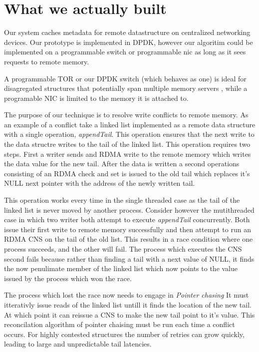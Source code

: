 \section{What we actually built}

Our system caches metadata for remote datastructure on centralized
networking devices. Our prototype is implemented in DPDK, however our
algoritim could be implemented on a programmable switch or
programmable nic as long as it sees requests to remote memory. 

A programmable TOR or our DPDK switch (which behaves as one) is ideal
for disagregated structures that potentially span multiple memory
servers , while a programable NIC is limited to the memory it is
attached to. 

The purpose of our technique is to resolve write conflicts to remote
memory. As an example of a conflict take a linked list implemented as
a remote data structure with a single operation, \textit{appendTail}.
This operation ensures that the next write to the data structre writes
to the tail of the linked list. This operation requires two steps.
First a writer sends and RDMA write to the remote memory which writes
the data value for the new tail. After the data is written a second
operations consisting of an RDMA check and set is issued to the old
tail which replaces it's NULL next pointer with the address of the
newly written tail.

This operation works every time in the single threaded case as the
tail of the linked list is never moved by another process. Consider
however the mutithreaded case in which two writer both attempt to
execute \textit{appendTail} concurrently. Both issue their first write
to remote memory successfully and then attempt to run an RDMA CNS on
the tail of the old list. This results in a race condition where one
process succeeds, and the other will fail. The process which executes
the CNS second fails because rather than finding a tail with a next
value of NULL, it finds the now penulimate member of the linked list
which now points to the value issued by the process which won the
race. 

The process which lost the race now needs to engage in \textit{Pointer
chasing} It must itterativly issue reads of the linked list untill it
finds the location of the new tail. At which point it can reissue a
CNS to make the new tail point to it's value. This reconcilation
algorithm of pointer chaising must be run each time a conflict occurs.
For highly contested structures the number of retries can grow
quickly, leading to large and unpredictable tail latencies.

